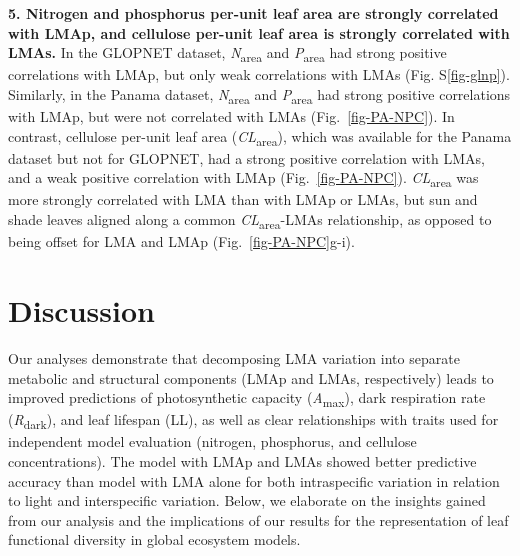 \documentclass[
  12pt,
  a4paper,
,tablecaptionabove
]{scrartcl}
\begin{document}
\textbf{5. Nitrogen and phosphorus per-unit leaf area are strongly
correlated with LMAp, and cellulose per-unit leaf area is strongly
correlated with LMAs.} In the GLOPNET dataset,
\emph{N}\textsubscript{area} and \emph{P}\textsubscript{area} had strong
positive correlations with LMAp, but only weak correlations with LMAs
(Fig. S\ref{fig-glnp}). Similarly, in the Panama dataset,
\emph{N}\textsubscript{area} and \emph{P}\textsubscript{area} had strong
positive correlations with LMAp, but were not correlated with LMAs
(Fig.~\ref{fig-PA-NPC}). In contrast, cellulose per-unit leaf area
(\emph{CL}\textsubscript{area}), which was available for the Panama
dataset but not for GLOPNET, had a strong positive correlation with
LMAs, and a weak positive correlation with LMAp (Fig.~\ref{fig-PA-NPC}).
\emph{CL}\textsubscript{area} was more strongly correlated with LMA than
with LMAp or LMAs, but sun and shade leaves aligned along a common
\emph{CL}\textsubscript{area}-LMAs relationship, as opposed to being
offset for LMA and LMAp (Fig.~\ref{fig-PA-NPC}g-i).

\hypertarget{discussion}{%
\section{Discussion}\label{discussion}}

Our analyses demonstrate that decomposing LMA variation into separate
metabolic and structural components (LMAp and LMAs, respectively) leads
to improved predictions of photosynthetic capacity
(\emph{A}\textsubscript{max}), dark respiration rate
(\emph{R}\textsubscript{dark}), and leaf lifespan (LL), as well as clear
relationships with traits used for independent model evaluation
(nitrogen, phosphorus, and cellulose concentrations). The model with
LMAp and LMAs showed better predictive accuracy than model with LMA
alone for both intraspecific variation in relation to light and
interspecific variation. Below, we elaborate on the insights gained from
our analysis and the implications of our results for the representation
of leaf functional diversity in global ecosystem models.
\end{document}
